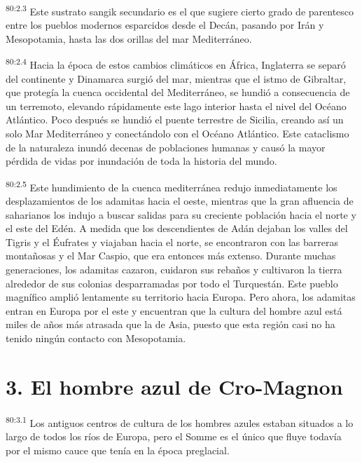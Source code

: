 \par
\textsuperscript{80:2.3} Este sustrato sangik secundario es el que sugiere cierto grado de parentesco entre los pueblos modernos esparcidos desde el Decán, pasando por Irán y Mesopotamia, hasta las dos orillas del mar Mediterráneo.

\par
\textsuperscript{80:2.4} Hacia la época de estos cambios climáticos en África, Inglaterra se separó del continente y Dinamarca surgió del mar, mientras que el istmo de Gibraltar, que protegía la cuenca occidental del Mediterráneo, se hundió a consecuencia de un terremoto, elevando rápidamente este lago interior hasta el nivel del Océano Atlántico. Poco después se hundió el puente terrestre de Sicilia, creando así un solo Mar Mediterráneo y conectándolo con el Océano Atlántico. Este cataclismo de la naturaleza inundó decenas de poblaciones humanas y causó la mayor pérdida de vidas por inundación de toda la historia del mundo.

\par
\textsuperscript{80:2.5} Este hundimiento de la cuenca mediterránea redujo inmediatamente los desplazamientos de los adamitas hacia el oeste, mientras que la gran afluencia de saharianos los indujo a buscar salidas para su creciente población hacia el norte y el este del Edén. A medida que los descendientes de Adán dejaban los valles del Tigris y el Éufrates y viajaban hacia el norte, se encontraron con las barreras montañosas y el Mar Caspio, que era entonces más extenso. Durante muchas generaciones, los adamitas cazaron, cuidaron sus rebaños y cultivaron la tierra alrededor de sus colonias desparramadas por todo el Turquestán. Este pueblo magnífico amplió lentamente su territorio hacia Europa. Pero ahora, los adamitas entran en Europa por el este y encuentran que la cultura del hombre azul está miles de años más atrasada que la de Asia, puesto que esta región casi no ha tenido ningún contacto con Mesopotamia.

\section*{3. El hombre azul de Cro-Magnon}
\par
\textsuperscript{80:3.1} Los antiguos centros de cultura de los hombres azules estaban situados a lo largo de todos los ríos de Europa, pero el Somme es el único que fluye todavía por el mismo cauce que tenía en la época preglacial.

